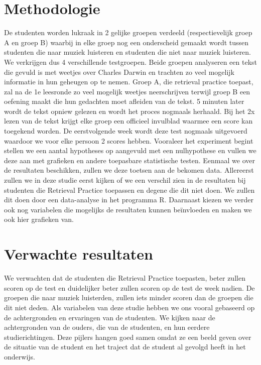 \documentclass{hogent-article}
\begin{document}
	
	\section{Methodologie}
	
	De studenten worden lukraak in 2 gelijke groepen verdeeld (respectievelijk groep A en groep B) waarbij in elke groep nog een onderscheid gemaakt wordt tussen studenten die naar muziek luisteren en studenten die niet naar muziek luisteren. We verkrijgen dus 4 verschillende testgroepen. Beide groepen analyseren een tekst die gevuld is met weetjes over Charles Darwin en trachten zo veel mogelijk informatie in hun geheugen op te nemen. Groep A, die retrieval practice toepast, zal na de 1e leesronde zo veel mogelijk weetjes neerschrijven terwijl groep B een oefening maakt die hun gedachten moet afleiden van de tekst. 5 minuten later wordt de tekst opniew gelezen en wordt het proces nogmaals herhaald. Bij het 2x lezen van de tekst krijgt elke groep een officieel invulblad waarmee een score kan toegekend worden. De eerstvolgende week wordt deze test nogmaals uitgevoerd waardoor we voor elke persoon 2 scores hebben. 
	Vooraleer het experiment begint stellen we een aantal hypotheses op aangevuld met een nulhypothese en vullen we deze aan met grafieken en andere toepasbare statistische testen. Eenmaal we over de resultaten beschikken, zullen we deze toetsen aan de bekomen data.
	Allereerst zullen we in deze studie eerst kijken of we een verschil zien in de resultaten bij studenten die Retrieval Practice toepassen en degene die dit niet doen. We zullen dit doen door een data-analyse in het programma R. Daarnaast kiezen we verder ook nog variabelen die mogelijks de resultaten kunnen beïnvloeden en maken we ook hier grafieken van.
	
	\section{Verwachte resultaten}
	\label{sec:verwachte_resultaten}
	We verwachten dat de studenten die Retrieval Practice toepasten, beter zullen scoren op de test en duidelijker beter zullen scoren op de test de week nadien. De groepen die naar muziek luisterden, zullen iets minder scoren dan de groepen die dit niet deden. Als variabelen van deze studie hebben we ons vooral gebaseerd op de achtergronden en ervaringen van de studenten. We kijken naar de achtergronden van de ouders, die van de studenten, en hun eerdere studierichtingen. Deze pijlers hangen goed samen omdat ze een beeld geven over de situatie van de student en het traject dat de student al gevolgd heeft in het onderwijs.
	
\end{document}
